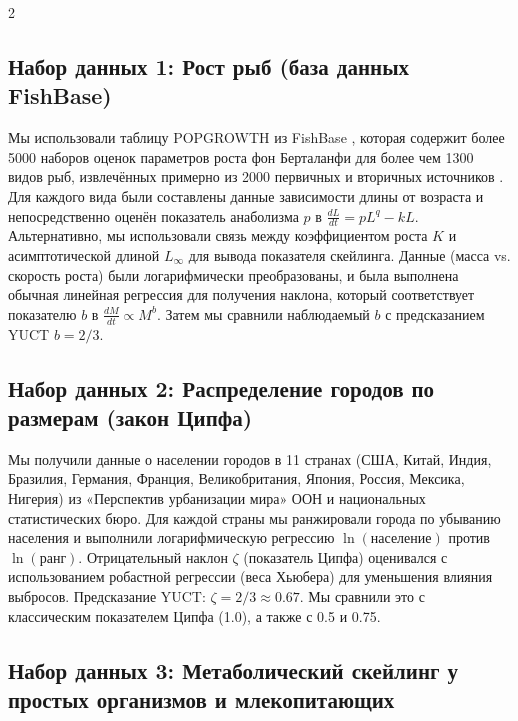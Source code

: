 \documentclass[11pt,a4paper]{article}
\begin{document}
\begin{multicols}{2}
		\subsection{Набор данных 1: Рост рыб (база данных FishBase)}
		
		Мы использовали таблицу POPGROWTH из FishBase \cite{FishBase}, которая содержит более 5000 наборов оценок параметров роста фон Берталанфи для более чем 1300 видов рыб, извлечённых примерно из 2000 первичных и вторичных источников \cite{Pauly1998}. Для каждого вида были составлены данные зависимости длины от возраста и непосредственно оценён показатель анаболизма \(p\) в \(\frac{dL}{dt} = p L^{q} - k L\). Альтернативно, мы использовали связь между коэффициентом роста \(K\) и асимптотической длиной \(L_\infty\) для вывода показателя скейлинга. Данные (масса vs. скорость роста) были логарифмически преобразованы, и была выполнена обычная линейная регрессия для получения наклона, который соответствует показателю \(b\) в \(\frac{dM}{dt} \propto M^{b}\). Затем мы сравнили наблюдаемый \(b\) с предсказанием YUCT \(b = 2/3\).
		
		\subsection{Набор данных 2: Распределение городов по размерам (закон Ципфа)}
		
		Мы получили данные о населении городов в 11 странах (США, Китай, Индия, Бразилия, Германия, Франция, Великобритания, Япония, Россия, Мексика, Нигерия) из «Перспектив урбанизации мира» ООН \cite{UN2018} и национальных статистических бюро. Для каждой страны мы ранжировали города по убыванию населения и выполнили логарифмическую регрессию \(\ln(\text{население})\) против \(\ln(\text{ранг})\). Отрицательный наклон \(\zeta\) (показатель Ципфа) оценивался с использованием робастной регрессии (веса Хьюбера) для уменьшения влияния выбросов. Предсказание YUCT: \(\zeta = 2/3 \approx 0.67\). Мы сравнили это с классическим показателем Ципфа (1.0), а также с 0.5 и 0.75.
		
		\subsection{Набор данных 3: Метаболический скейлинг у простых организмов и млекопитающих}
		

\end{multicols}
\end{document}
